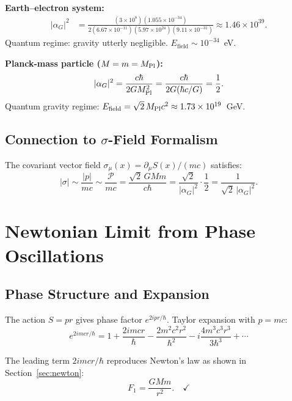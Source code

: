 \documentclass[11pt,a4paper]{article}
\theoremstyle{definition}
\theoremstyle{remark}
\begin{document}
	\textbf{Earth--electron system:}
	\begin{align}
		|\alpha_G|^2 &= \frac{(3\times10^8)(1.055\times10^{-34})}{2(6.67\times10^{-11})(5.97\times10^{24})(9.11\times10^{-31})} \approx 1.46\times10^{39}.
	\end{align}
	Quantum regime: gravity utterly negligible. $E_{\mathrm{field}}\sim 10^{-34}$~eV.
	
	\textbf{Planck-mass particle ($M=m=M_{\rm Pl}$):}
	\begin{equation}
		|\alpha_G|^2 = \frac{c\hbar}{2GM_{\rm Pl}^2} = \frac{c\hbar}{2G(\hbar c/G)} = \frac{1}{2}.
	\end{equation}
	Quantum gravity regime: $E_{\mathrm{field}} = \sqrt{2}\,M_{\rm Pl}c^2\approx 1.73\times10^{19}$~GeV.
	
	\subsection{Connection to $\sigma$-Field Formalism}
	
	The covariant vector field $\sigma_\mu(x)=\partial_\mu S(x)/(mc)$ satisfies:
	\begin{equation}
		|\sigma| \sim \frac{|p|}{mc} \sim \frac{\mathcal{P}}{mc} = \frac{\sqrt{2}\,GMm}{c\hbar} = \frac{\sqrt{2}}{|\alpha_G|^2}\cdot\frac{1}{2} = \frac{1}{\sqrt{2}\,|\alpha_G|^2}.
	\end{equation}
	
	\section{Newtonian Limit from Phase Oscillations}
	
	\subsection{Phase Structure and Expansion}
	
	The action $S=pr$ gives phase factor $e^{2ipr/\hbar}$.  Taylor expansion with $p=mc$:
	\begin{equation}
		e^{2imcr/\hbar} = 1 + \frac{2imcr}{\hbar} - \frac{2m^2c^2r^2}{\hbar^2} - i\frac{4m^3c^3r^3}{3\hbar^3} + \cdots
	\end{equation}
	
	The leading term $2imcr/\hbar$ reproduces Newton's law as shown in Section~\ref{sec:newton}:
	\begin{equation}
		F_1 = \frac{GMm}{r^2}. \quad\checkmark
	\end{equation}
	
\end{document}
